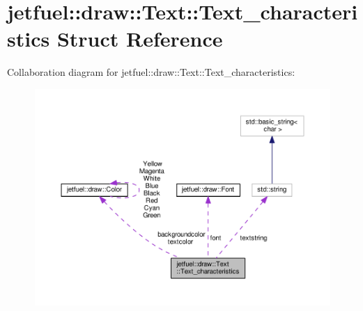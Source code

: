 \hypertarget{structjetfuel_1_1draw_1_1Text_1_1Text__characteristics}{}\section{jetfuel\+:\+:draw\+:\+:Text\+:\+:Text\+\_\+characteristics Struct Reference}
\label{structjetfuel_1_1draw_1_1Text_1_1Text__characteristics}


Collaboration diagram for jetfuel\+:\+:draw\+:\+:Text\+:\+:Text\+\_\+characteristics\+:
\nopagebreak
\begin{figure}[H]
\begin{center}
\leavevmode
\includegraphics[width=350pt]{structjetfuel_1_1draw_1_1Text_1_1Text__characteristics__coll__graph}
\end{center}
\end{figure}
